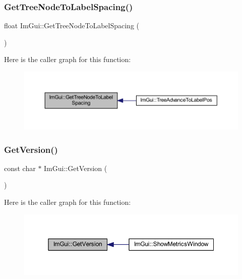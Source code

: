 \subsubsection{\texorpdfstring{Get\+Tree\+Node\+To\+Label\+Spacing()}{GetTreeNodeToLabelSpacing()}}
{\footnotesize\ttfamily float Im\+Gui\+::\+Get\+Tree\+Node\+To\+Label\+Spacing (\begin{DoxyParamCaption}{ }\end{DoxyParamCaption})}

Here is the caller graph for this function\+:
\nopagebreak
\begin{figure}[H]
\begin{center}
\leavevmode
\includegraphics[width=350pt]{namespace_im_gui_a5c89cb6b42296d0f7db75027efc0fb7a_icgraph}
\end{center}
\end{figure}
\mbox{\label{namespace_im_gui_a6488c3cfa6331c8a1e93769e580ce020}} 
\subsubsection{\texorpdfstring{Get\+Version()}{GetVersion()}}
{\footnotesize\ttfamily const char $\ast$ Im\+Gui\+::\+Get\+Version (\begin{DoxyParamCaption}{ }\end{DoxyParamCaption})}

Here is the caller graph for this function\+:
\nopagebreak
\begin{figure}[H]
\begin{center}
\leavevmode
\includegraphics[width=350pt]{namespace_im_gui_a6488c3cfa6331c8a1e93769e580ce020_icgraph}
\end{center}
\end{figure}
\mbox{\label{namespace_im_gui_a4189cc4ec6ac56f3b21b29165d09ff98}} 
